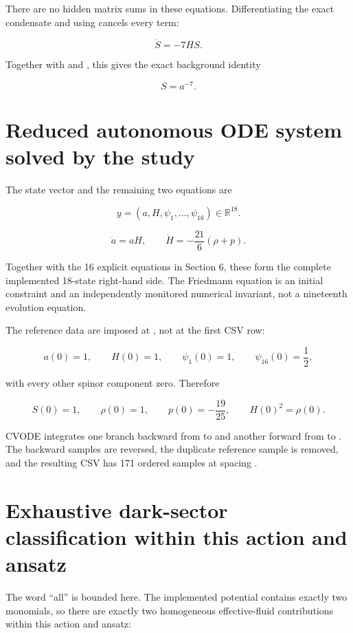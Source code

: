 \documentclass[11pt]{article}
\begin{document}
There are no hidden matrix sums in these equations. Differentiating the exact condensate and using \texttt{} cancels every \texttt{} term:

\[
\dot S=-7HS.
\]

Together with \texttt{} and \texttt{}, this gives the exact background identity

\[
\boxed{S=a^{-7}}.
\]

\section{Reduced autonomous ODE system solved by the study}

The state vector and the remaining two equations are

\[
y=(a,H,\psi_1,\ldots,\psi_{16})\in\mathbb R^{18}.
\]

\[
\dot a=aH,
\qquad
\dot H=-\frac{21}{6}(\rho+p).
\]

Together with the 16 explicit equations in Section 6, these form the complete implemented 18-state right-hand side. The Friedmann equation \texttt{} is an initial constraint and an independently monitored numerical invariant, not a nineteenth evolution equation.

The reference data are imposed at \texttt{}, not at the first CSV row:

\[
a(0)=1,
\qquad H(0)=1,
\qquad \psi_1(0)=1,
\qquad \psi_{16}(0)=\frac12,
\]

with every other spinor component zero. Therefore

\[
S(0)=1,
\qquad \rho(0)=1,
\qquad p(0)=-\frac{19}{25},
\qquad H(0)^2=\rho(0).
\]

CVODE integrates one branch backward from \texttt{} to \texttt{} and another forward from \texttt{} to \texttt{}. The backward samples are reversed, the duplicate reference sample is removed, and the resulting CSV has 171 ordered samples at spacing \texttt{}.

\section{Exhaustive dark-sector classification within this action and ansatz}

The word ``all'' is bounded here. The implemented potential contains exactly two monomials, so there are exactly two homogeneous effective-fluid contributions within this action and ansatz:
\end{document}
